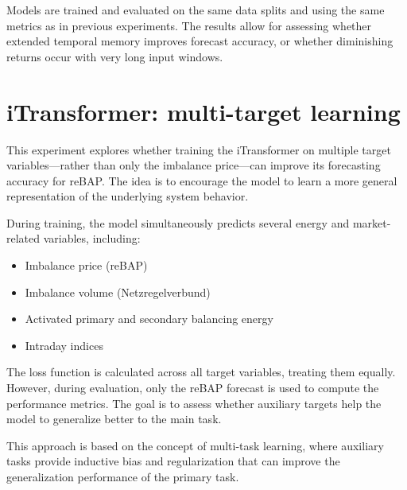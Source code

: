\documentclass[class=scrbook, crop=false]{standalone}
\begin{document}
Models are trained and evaluated on the same data splits and using the same metrics as in previous experiments. The results allow for assessing whether extended temporal memory improves forecast accuracy, or whether diminishing returns occur with very long input windows.

   

\section{iTransformer: multi-target learning}
This experiment explores whether training the iTransformer on multiple target variables—rather than only the imbalance price—can improve its forecasting accuracy for reBAP. The idea is to encourage the model to learn a more general representation of the underlying system behavior.

During training, the model simultaneously predicts several energy and market-related variables, including:
\begin{itemize}
\item Imbalance price (reBAP)
\item Imbalance volume (Netzregelverbund)
\item Activated primary and secondary balancing energy
\item Intraday indices 
\end{itemize}

The loss function is calculated across all target variables, treating them equally. However, during evaluation, only the reBAP forecast is used to compute the performance metrics. The goal is to assess whether auxiliary targets help the model to generalize better to the main task.

This approach is based on the concept of multi-task learning, where auxiliary tasks provide inductive bias and regularization that can improve the generalization performance of the primary task.
\end{document}
